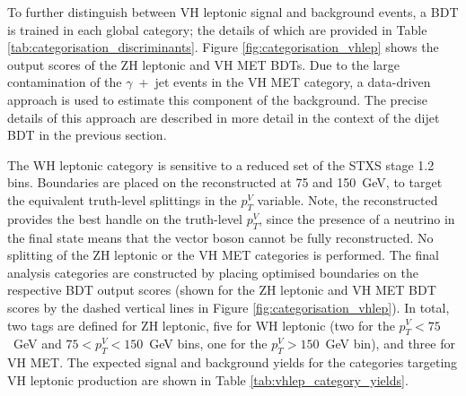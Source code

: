 To further distinguish between VH leptonic signal and background events, a BDT is trained in each global category; the details of which are provided in Table \ref{tab:categorisation_discriminants}. Figure \ref{fig:categorisation_vhlep} shows the output scores of the ZH leptonic and VH MET BDTs. Due to the large contamination of the $\gamma$~+~jet events in the VH MET category, a data-driven approach is used to estimate this component of the background. The precise details of this approach are described in more detail in the context of the dijet BDT in the previous section.

The WH leptonic category is sensitive to a reduced set of the STXS stage 1.2 bins. Boundaries are placed on the reconstructed \ptgg at 75 and 150~GeV, to target the equivalent truth-level splittings in the $p_T^V$ variable. Note, the reconstructed \ptgg provides the best handle on the truth-level $p_T^V$, since the presence of a neutrino in the final state means that the vector boson cannot be fully reconstructed. No splitting of the ZH leptonic or the VH MET categories is performed. The final analysis categories are constructed by placing optimised boundaries on the respective BDT output scores (shown for the ZH leptonic and VH MET BDT scores by the dashed vertical lines in Figure \ref{fig:categorisation_vhlep}). In total, two tags are defined for ZH leptonic, five for WH leptonic (two for the $p_T^V<75$~GeV and $75<p_T^V<150$~GeV bins, one for the $p_T^V>150$~GeV bin), and three for VH MET. The expected signal and background yields for the categories targeting VH leptonic production are shown in Table \ref{tab:vhlep_category_yields}.

